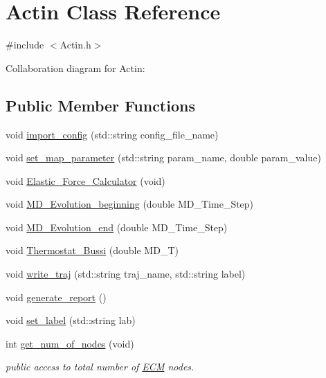 \hypertarget{classActin}{}\section{Actin Class Reference}
\label{classActin}


{\ttfamily \#include $<$Actin.\+h$>$}



Collaboration diagram for Actin\+:
\subsection*{Public Member Functions}
\begin{DoxyCompactItemize}
\item 
void \mbox{\hyperlink{classActin_a1758fb970eebc12ad08a2fa86a678236}{import\+\_\+config}} (std\+::string config\+\_\+file\+\_\+name)
\item 
void \mbox{\hyperlink{classActin_a93cbd48dc08c5d0f5130a41768b50ef6}{set\+\_\+map\+\_\+parameter}} (std\+::string param\+\_\+name, double param\+\_\+value)
\item 
void \mbox{\hyperlink{classActin_a08970f92fbaf37cfce9e983ec2f5eefa}{Elastic\+\_\+\+Force\+\_\+\+Calculator}} (void)
\item 
void \mbox{\hyperlink{classActin_ac8721458347af82c26f5c77351495116}{M\+D\+\_\+\+Evolution\+\_\+beginning}} (double M\+D\+\_\+\+Time\+\_\+\+Step)
\item 
void \mbox{\hyperlink{classActin_a2311cdc6c25be425fcd52863d628bf78}{M\+D\+\_\+\+Evolution\+\_\+end}} (double M\+D\+\_\+\+Time\+\_\+\+Step)
\item 
void \mbox{\hyperlink{classActin_a9e73b09a4cd982adc8a4879d7960d9bf}{Thermostat\+\_\+\+Bussi}} (double M\+D\+\_\+T)
\item 
void \mbox{\hyperlink{classActin_ab65dc5554a97210353818c736fd0414e}{write\+\_\+traj}} (std\+::string traj\+\_\+name, std\+::string label)
\item 
void \mbox{\hyperlink{classActin_a89a64e474276cba5062fb45013deda78}{generate\+\_\+report}} ()
\item 
void \mbox{\hyperlink{classActin_a59b0f9aec939cd38eb1bfe5971f6ea0d}{set\+\_\+label}} (std\+::string lab)
\item 
int \mbox{\hyperlink{classActin_a342dea409f97480770a7847533d6516c}{get\+\_\+num\+\_\+of\+\_\+nodes}} (void)
\begin{DoxyCompactList}\small\item\em public access to total number of \mbox{\hyperlink{classECM}{E\+CM}} nodes. \end{DoxyCompactList}\item 

\end{DoxyCompactItemize}
